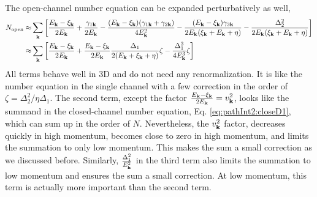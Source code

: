 The open-channel number equation  can be expanded perturbatively as well, 
\begin{equation}\label{eq:pathInt2:openNum}
\begin{split}
N_{\text{open}}\approx&\sum_{\mathbf{k}}\left[\frac{E_{\mathbf{k}}-\xi_{\mathbf{k}}}{2E_{\mathbf{k}}}+\frac{\gamma_{1\mathbf{k}}}{2E_{\mathbf{k}}}
	-\frac{(E_{\mathbf{k}}-\xi_{\mathbf{k}})(\gamma_{1\mathbf{k}}+\gamma_{2\mathbf{k}})}{4E_{\mathbf{k}}^2}
	-\frac{(E_{\mathbf{k}}-\xi_{\mathbf{k}})\gamma_{3\mathbf{k}}}{2E_{\mathbf{k}}(\xi_{\mathbf{k}}+E_{\mathbf{k}}+\eta)}
	-\frac{\Delta_{2}^{2}}{2E_{\mathbf{k}}(\xi_{\mathbf{k}}+E_{\mathbf{k}}+\eta)}\right]\\
	\approx&\sum_{\mathbf{k}}\left[\frac{E_{\mathbf{k}}-\xi_{\mathbf{k}}}{2E_{\mathbf{k}}}+\frac{E_{\mathbf{k}}-\xi_{\mathbf{k}}}{2E_{\mathbf{k}}}\frac{\Delta_{1}}{2(E_{\mathbf{k}}+\xi_{\mathbf{k}}+\eta)}\zeta -\frac{\Delta_{1}^{3}}{4E_{\mathbf{k}}^{3}}\zeta
	\right]	
\end{split}
\end{equation}
All terms behave well  in 3D and do not need any renormalization.   It is like the number equation in the single channel with  a few correction in the order of $\zeta=\Delta_2^2/\eta\Delta_{1}$.  The second term, except the factor $\frac{E_{\mathbf{k}}-\xi_{\mathbf{k}}}{2E_{\mathbf{k}}}=v_{\mathbf{k}}^{2}$, looks like the summand in the closed-channel number equation, Eq. \ref{eq:pathInt2:closeD1},  which can sum up in the order of $N$.  Nevertheless, the $v_{\mathbf{k}}^{2}$ factor, decreases quickly in high momentum, becomes close to zero in high momentum, and limits the summation to only low momentum. This makes the sum  a small correction as we discussed before.    Similarly, $\frac{\Delta_{1}^{2}}{E_{\mathbf{k}}^{2}}$ in the third term also limits the summation to low momentum and ensures the sum a small correction. At low momentum, this term is actually more important than the second term. 


%

